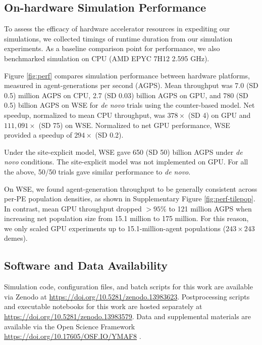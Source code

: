 \subsection{On-hardware Simulation Performance}
\label{sec:performance}



To assess the efficacy of hardware accelerator resources in expediting our simulations, we collected timings of runtime duration from our simulation experiments.
As a baseline comparison point for performance, we also benchmarked simulation on CPU (AMD EPYC 7H12 2.595 GHz).

Figure \ref{fig:perf} compares simulation performance between hardware platforms, measured in agent-generations per second (AGPS).
Mean throughput was 7.0 (SD 0.5) million AGPS on CPU, 2.7 (SD 0.03) billion AGPS on GPU, and 780 (SD 0.5) billion AGPS on WSE for \textit{de novo} trials using the counter-based model.
Net speedup, normalized to mean CPU throughput, was $378\times$ (SD 4) on GPU and $111,091\times$ (SD 75) on WSE.
Normalized to net GPU performance, WSE provided a speedup of $294\times$ (SD 0.2).

Under the site-explicit model, WSE gave 650 (SD 50) billion AGPS under \textit{de novo} conditions.
The site-explicit model was not implemented on GPU.
For all the above, 50/50 trials gave similar performance to \textit{de novo}.

On WSE, we found agent-generation throughput to be generally consistent across per-PE population densities, as shown in Supplementary Figure \ref{fig:perf-tilepop}.
In contrast, mean GPU throughput dropped $>95\%$ to 121 million AGPS when increasing net population size from 15.1 million to 175 million.
For this reason, we only scaled GPU experiments up to 15.1-million-agent populations ($243 \times 243$ demes).

\subsection{Software and Data Availability} \label{sec:materials}

Simulation code, configuration files, and batch scripts for this work are available via Zenodo at \url{https://doi.org/10.5281/zenodo.13983623}.
Postprocessing scripts and executable notebooks for this work are hosted separately at \url{https://doi.org/10.5281/zenodo.13983579}.
Data and supplemental materials are available via the Open Science Framework \url{https://doi.org/10.17605/OSF.IO/YMAF8} \citep{foster2017open}.

